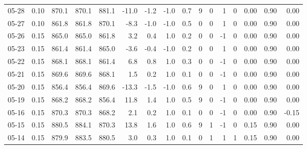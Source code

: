 \begin{threeparttable}
{\begin{tabular}{lrrrrrrrrrrrrrrr}
  05-28 &     0.10 & 870.1 & 870.1 & 881.1 &      -11.0 &           -1.2 &                     -1.0 &                 0.7 &              9 &         0 &     1 &         0 &       0.00 &      0.90 &           0.00 \\
  05-27 &     0.10 & 861.8 & 861.8 & 870.1 &       -8.3 &           -1.0 &                     -1.0 &                 0.5 &              0 &         0 &     1 &         0 &       0.00 &      0.90 &           0.00 \\
  05-26 &     0.15 & 865.0 & 865.0 & 861.8 &        3.2 &            0.4 &                      1.0 &                 0.2 &              0 &         0 &    -1 &         0 &       0.00 &      0.90 &           0.00 \\
  05-23 &     0.15 & 861.4 & 861.4 & 865.0 &       -3.6 &           -0.4 &                     -1.0 &                 0.2 &              0 &         0 &     1 &         0 &       0.00 &      0.90 &           0.00 \\
  05-22 &     0.15 & 868.1 & 868.1 & 861.4 &        6.8 &            0.8 &                      1.0 &                 0.3 &              0 &         0 &    -1 &         0 &       0.00 &      0.90 &           0.00 \\
  05-21 &     0.15 & 869.6 & 869.6 & 868.1 &        1.5 &            0.2 &                      1.0 &                 0.1 &              0 &         0 &    -1 &         0 &       0.00 &      0.90 &           0.00 \\
  05-20 &     0.15 & 856.4 & 856.4 & 869.6 &      -13.3 &           -1.5 &                     -1.0 &                 0.6 &              9 &         0 &     1 &         0 &       0.00 &      0.90 &           0.00 \\
  05-19 &     0.15 & 868.2 & 868.2 & 856.4 &       11.8 &            1.4 &                      1.0 &                 0.5 &              9 &         0 &    -1 &         0 &       0.00 &      0.90 &           0.00 \\
  05-16 &     0.15 & 870.3 & 870.3 & 868.2 &        2.1 &            0.2 &                      1.0 &                 0.1 &              0 &         0 &    -1 &         0 &       0.00 &      0.90 &          -0.15 \\
  05-15 &     0.15 & 880.5 & 884.1 & 870.3 &       13.8 &            1.6 &                      1.0 &                 0.6 &              9 &         1 &    -1 &         0 &       0.15 &      0.90 &           0.00 \\
  05-14 &     0.15 & 879.9 & 883.5 & 880.5 &        3.0 &            0.3 &                      1.0 &                 0.1 &              0 &         1 &     1 &         1 &       0.15 &      0.90 &           0.00 \\

\end{tabular}}
\end{threeparttable}
